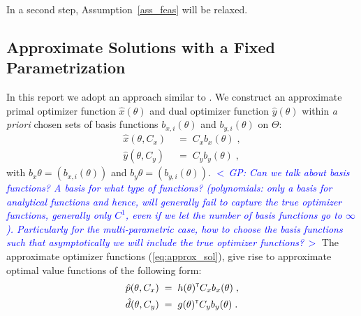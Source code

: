 \documentclass{article}
\renewcommand{\t}{^{\mbox{\tiny \sf T}}}    %
\newcommand{\ppar}{\theta}                  %
\newcommand{\Ppar}{\Theta}                  %
\newcommand{\commentGP}[1]{\noindent \textcolor{blue}{\emph{$<\,$GP: #1$\,>$}}}%
\begin{document}
In a second step, Assumption~\ref{ass_feas} will be relaxed.



\subsection{Approximate Solutions with a Fixed Parametrization}\label{subsec:parameterized_solution}%

In this report we adopt an approach similar to \cite{Oishi2013}. We construct an approximate primal optimizer function $\hat{x}(\ppar)$ and dual optimizer function $\hat{y}(\ppar)$ within \textit{a priori} chosen sets of basis functions $b_{x,i}(\ppar)$ and $b_{y,i}(\ppar)$ on $\Ppar$:
\begin{subequations}\label{eq:approx_sol}
\begin{align}
\hat{x}(\ppar, C_x) &\;=\; C_x b_x(\ppar)\;, \label{eq:approx_sol_primal}\\
\hat{y}(\ppar, C_y) &\;=\; C_y b_y(\ppar)\;, \label{eq:approx_sol_dual}
\end{align}
\end{subequations}
with $b_x{\ppar}=(b_{x,i}(\ppar))$ and $b_y{\ppar}=(b_{y,i}(\ppar))$. \commentGP{Can we talk about basis functions? A basis for what type of functions? (polynomials: only a basis for analytical functions and hence, will generally fail to capture the true optimizer functions, generally only $C^1$, even if we let the number of basis functions go to $\infty$). Particularly for the multi-parametric case, how to choose the basis functions such that asymptotically we will include the true optimizer functions?} The approximate optimizer functions (\ref{eq:approx_sol}), give rise to approximate optimal value functions of the following form:
\begin{align*}
\hat{p}(\ppar, C_x) &\;=\;  h(\ppar)\t  C_x b_x(\ppar)\;,\\
\hat{d}(\ppar, C_y) &\;=\;  g(\ppar)\t  C_y b_y(\ppar)\;.
\end{align*}
\end{document}
